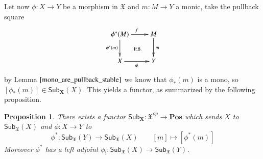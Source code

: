 \documentclass[12pt]{article}
\newtheorem{proposition}[lemma]{Proposition}
\theoremstyle{definition}
\def\X{\mathfrak X}
\numberwithin{equation}{section}
\newcommand{\catname}[1]{\mathbf{#1}}
\newcommand{\sub}[1]{\mathsf{Sub}_{\catname{#1}}}
\begin{document}
\medskip 

Let now $\phi:X\rightarrow Y$ be a morphism in $\X$ and $m:M\rightarrow Y$ a monic, take the pullback square
\[\xymatrix{
	\phi^*(M)\ar@{}[dr]|-{\text{P.B.}}\ar[d]_{\phi^*(m)}\ar[r]^{f}&M\ar[d]^m\\
	X\ar[r]_{\phi}&Y
}
\]
by Lemma $\ref{mono_are_pullback_stable}$ we know that $\phi_*(m)$ is a mono, so $[\phi_*(m)]\in \sub{X}(X)$. This yields a functor, as summarized by the following proposition.

\begin{proposition}\label{prop_monos_lemma}
There exists a functor $\sub{X}:\X^{op}\rightarrow \catname{Pos}$ which sends $X$ to $\sub{\X}(X)$ and $\phi:X\rightarrow Y$ to
\[
\phi^*:\sub{\X}(Y)\rightarrow \sub{\X}(X)\qquad 
[m]\mapsto [\phi^*(m)]
\]
Moreover $\phi^*$ has a left adjoint $\phi_!:\sub{\X}(X)\rightarrow \sub{\X}(Y)$.
\end{proposition}
\end{document}
